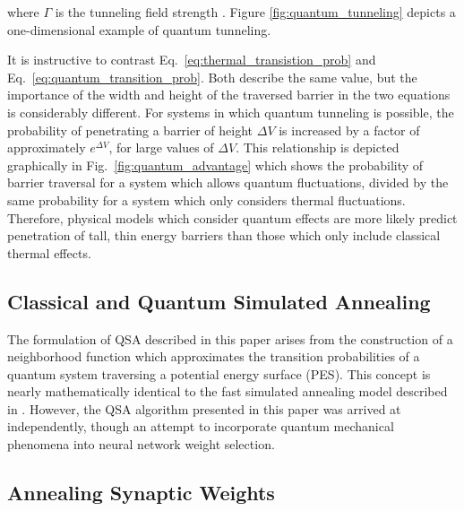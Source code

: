 \documentclass[10pt,journal,cspaper,compsoc]{IEEEtran}
\begin{document}
\noindent where \begin{math} \Gamma \end{math} is the tunneling field strength \cite{mukherjee2015multivariatesearchqa}. Figure \ref{fig:quantum_tunneling} depicts a one-dimensional example of quantum tunneling.

It is instructive to contrast Eq.~\ref{eq:thermal_transistion_prob} and Eq.~\ref{eq:quantum_transition_prob}. Both describe the same value, but the importance of the width and height of the traversed barrier in the two equations is considerably different. For systems in which quantum tunneling is possible, the probability of penetrating a barrier of height $\Delta V$ is increased by a factor of approximately $e^{\Delta V}$, for large values of $\Delta V$. This relationship is depicted graphically in Fig.~\ref{fig:quantum_advantage} which shows the probability of barrier traversal for a system which allows quantum fluctuations, divided by the same probability for a system which only considers thermal fluctuations. Therefore, physical models which consider quantum effects are more likely predict penetration of tall, thin energy barriers than those which only include classical thermal effects.


\subsection{Classical and Quantum Simulated Annealing}
\label{scn:classical_quantum_simulated_annealing}

The formulation of QSA described in this paper arises from the construction of a neighborhood function which approximates the transition probabilities of a quantum system traversing a potential energy surface (PES). This concept is nearly mathematically identical to the fast simulated annealing model described in \cite{szu1987fastsimulatedannealing}. However, the QSA algorithm presented in this paper was arrived at independently, though an attempt to incorporate quantum mechanical phenomena into neural network weight selection.



\subsection{Annealing Synaptic Weights}
\label{scn:weight_selection}
\end{document}
